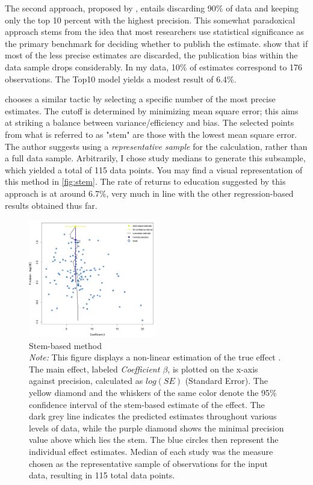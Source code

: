 The second approach, proposed by \cite{Stanley2010Top}, entails discarding 90\% of data and keeping only the top 10 percent with the highest precision. This somewhat paradoxical approach stems from the idea that most researchers use statistical significance as the primary benchmark for deciding whether to publish the estimate. \cite{Stanley2010Top} show that if most of the less precise estimates are discarded, the publication bias within the data sample drops considerably. In my data, 10\% of estimates correspond to 176 observations. The Top10 model yields a modest result of 6.4\%.

\cite{Furukawa2019Stem} chooses a similar tactic by selecting a specific number of the most precise estimates. The cutoff is determined by minimizing mean square error; this aims at striking a balance between variance/efficiency and bias. The selected points from what is referred to as "stem" are those with the lowest mean square error. The author suggests using a \textit{representative sample} for the calculation, rather than a full data sample. Arbitrarily, I chose study medians to generate this subsample, which yielded a total of 115 data points. You may find a visual representation of this method in \autoref{fig:stem}. The rate of returns to education suggested by this approach is at around 6.7\%, very much in line with the other regression-based results obtained thus far.

\begin{figure}
\centering
\captionsetup{font = scriptsize}
\caption[Stem-based method]{\vspace{0.5cm}Stem-based method\\ \emph{Note:} This figure displays a non-linear estimation of the true effect \citep{Furukawa2019Stem}. The main effect, labeled \textit{Coefficient $\beta$}, is plotted on the x-axis against precision, calculated as $log(SE)$ (Standard Error). The yellow diamond and the whiskers of the same color denote the 95\% confidence interval of the stem-based estimate of the effect. The dark grey line indicates the predicted estimates throughout various levels of data, while the purple diamond shows the minimal precision value above which lies the stem. The blue circles then represent the individual effect estimates. Median of each study was the measure chosen as the representative sample of observations for the input data, resulting in 115 total data points.}
\label{fig:stem}
\includegraphics[width=0.5\textwidth]{Figures/stem.png}
\end{figure}

